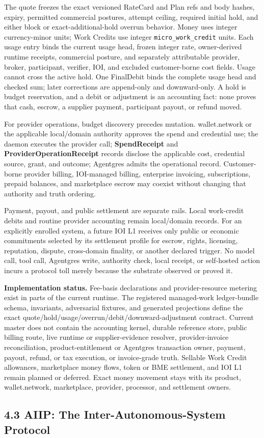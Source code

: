 \documentclass[
  11pt,
]{article}
\begin{document}
The quote freezes the exact versioned RateCard and Plan refs and body hashes,
expiry, permitted commercial postures, attempt ceiling, required initial hold,
and either block or exact-additional-hold overrun behavior. Money uses integer
currency-minor units; Work Credits use integer
\texttt{micro\_work\_credit} units. Each usage entry binds the current usage
head, frozen integer rate, owner-derived runtime receipts, commercial posture,
and separately attributable provider, broker, participant, verifier, IOI, and
excluded customer-borne cost fields. Usage cannot cross the active hold. One
FinalDebit binds the complete usage head and checked sum; later corrections are
append-only and downward-only. A hold is budget reservation, and a debit or
adjustment is an accounting fact: none proves that cash, escrow, a supplier
payment, participant payout, or refund moved.

For provider operations, budget discovery precedes mutation. wallet.network or
the applicable local/domain authority approves the spend and credential use;
the daemon executes the provider call; \textbf{SpendReceipt} and
\textbf{ProviderOperationReceipt} records disclose the applicable cost,
credential source, grant, and outcome; Agentgres admits the operational
record. Customer-borne provider billing, IOI-managed billing, enterprise
invoicing, subscriptions, prepaid balances, and marketplace escrow may coexist
without changing that authority and truth ordering.

Payment, payout, and public settlement are separate rails. Local work-credit
debits and routine provider accounting remain local/domain records. For an
explicitly enrolled system, a future IOI L1 receives only public or economic
commitments selected by its settlement profile for escrow, rights, licensing,
reputation, dispute, cross-domain finality, or another declared trigger. No
model call, tool call, Agentgres write,
authority check, local receipt, or self-hosted action incurs a protocol toll
merely because the substrate observed or proved it.

\textbf{Implementation status.} Fee-basis declarations and provider-resource
metering exist in parts of the current runtime. The registered managed-work
ledger-bundle schema, invariants, adversarial fixtures, and generated
projections define the exact
quote/hold/usage/overrun/debit/downward-adjustment contract. Current master
does not contain the accounting kernel, durable reference store, public billing
route, live runtime or supplier-evidence resolver, provider-invoice
reconciliation, product-entitlement or Agentgres transaction owner, payment,
payout, refund, or tax execution, or invoice-grade truth. Sellable Work Credit
allowances, marketplace money flows, token or BME settlement, and IOI L1 remain
planned or deferred. Exact money movement stays with its product,
wallet.network, marketplace, provider, processor, and settlement owners.
\hypertarget{aiip-the-inter-autonomous-system-protocol}{%
\subsection{4.3 AIIP: The Inter-Autonomous-System
Protocol}\label{aiip-the-inter-autonomous-system-protocol}}
\end{document}
